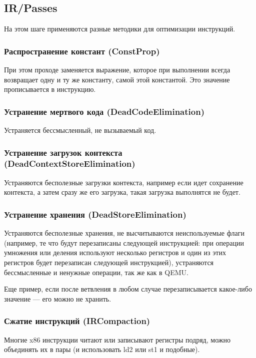 \subsection{IR/Passes}

На этом шаге применяются разные методики для оптимизации инструкций.

\subsubsection{Распространение констант (ConstProp)}
При этом проходе заменяется выражение, которое при выполнении всегда возвращает одну и ту же константу, самой этой константой. Это значение прописывается в инструкцию.

\subsubsection{Устранение мертвого кода (DeadCodeElimination)}
Устраняется бессмысленный, не вызываемый код.

\subsubsection{Устранение загрузок контекста (DeadContextStoreElimination)}
Устраняются бесполезные загрузки контекста, например если идет сохранение контекста, а затем сразу же его загрузка, такая загрузка выполнятся не будет. 

\subsubsection{Устранение хранения (DeadStoreElimination)}
Устраняются бесполезные хранения, не высчитываются неиспользуемые флаги (например, те что будут перезаписаны следующей инструкцией: при операции умножения или деления используют несколько регистров и один из этих регистров будет перезаписан следующей инструкцией), устраняются бессмысленные и ненужные операции, так же как в QEMU.

Еще пример, если после ветвления в любом случае перезаписывается какое-либо значение — его можно не хранить.

\subsubsection{Сжатие инструкций (IRCompaction)}
Многие x86 инструкции читают или записывают регистры подряд, можно объединять их в пары (и использовать ld2 или st1 и подобные).

